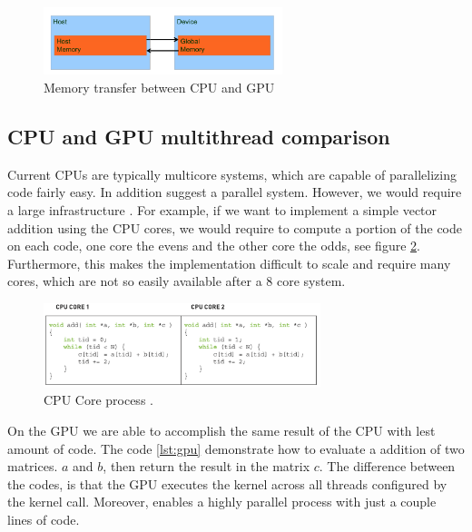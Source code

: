\begin{figure}[htbp]
	\centering
		\includegraphics[width=0.62\textwidth]{Figures/memorySpace.png}
		\smallskip
	\caption[Memory transfer between CPU and GPU]{Memory transfer between CPU and GPU \cite{hwu}}
	\label{fig:memorySpace}
\end{figure}

\subsection{CPU and GPU multithread comparison}

Current CPUs are typically multicore systems, which are capable of parallelizing code fairly easy. In addition suggest a parallel system. However, we would require a large infrastructure  \cite{example}. For example, if we want to implement a simple vector addition using the CPU cores, we would require to compute a portion of the code on each code, one core the evens and the other core the odds, see figure \ref{fig:cpu}. Furthermore, this makes the implementation difficult to scale and require many cores, which are not so easily available after a 8 core system. 

\begin{figure}[htbp]
	\centering
		\includegraphics[width=0.72\textwidth]{Figures/cpu.png}
		\smallskip
	\caption[CPU Core process]{CPU Core process \cite{hwu}.}
	\label{fig:cpu}
\end{figure}


On the GPU we are able to accomplish the same result of the CPU with lest amount of code. The code \ref{lst:gpu} demonstrate how to evaluate a addition of two matrices. $a$ and $b$, then return the result in the matrix $c$. The difference between the codes, is that the GPU executes the kernel across all threads configured by the kernel call. Moreover, enables a highly parallel process with just a couple lines of code. 

